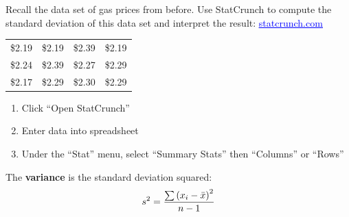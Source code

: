 \documentclass[../mathNotesPreamble]{subfiles}
\begin{document}
  \begin{ex*}
    Recall the data set of gas prices from before. Use StatCrunch to compute the standard deviation of this data set and interpret the result:
    \href{https://www.statcrunch.com/}{\textcolor{blue}{\underline{statcrunch.com}}}

  \end{ex*}
  \begin{center}
    \begin{tabular}{@{}*{4}{c}@{}}\toprule
      \$2.19 & \$2.19 & \$2.39 & \$2.19 \\
      \$2.24 & \$2.39 & \$2.27 & \$2.29 \\
      \$2.17 & \$2.29 & \$2.30 & \$2.29 \\\bottomrule
    \end{tabular}
  \end{center}
  \begin{enumerate}
    \item Click ``Open StatCrunch''
    \item Enter data into spreadsheet
    \item Under the ``Stat'' menu, select ``Summary Stats'' then ``Columns'' or ``Rows''
  \end{enumerate}
  \begin{defn*}
    The \textbf{variance} is the standard deviation squared:
      \[s^2=\frac{\sum {\left(x_i-\bar{x}\right)}^2}{n-1}\]
    \vspace*{-\baselineskip}
  \end{defn*}

  \pagebreak
\end{document}
